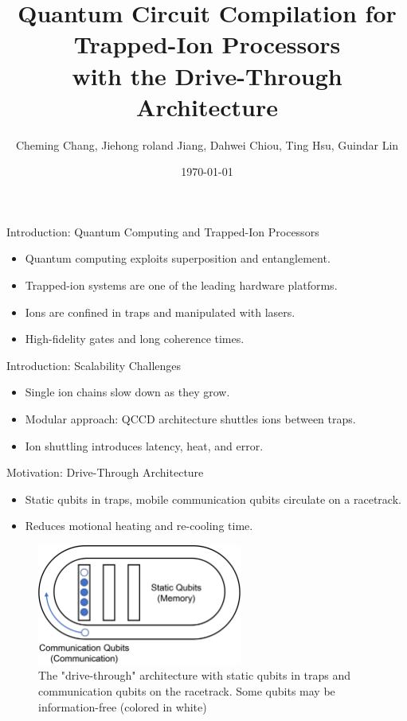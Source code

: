\documentclass{beamer}
\title{Quantum Circuit Compilation for Trapped-Ion Processors\\with the Drive-Through Architecture}
\author{Cheming Chang, Jiehong roland Jiang, Dahwei Chiou, Ting Hsu, Guindar Lin}
\institute{Taipei, Taiwan}
\date{\today}
\begin{document}
	
	\begin{frame}
		\titlepage
	\end{frame}
	
	\begin{frame}{Introduction: Quantum Computing and Trapped-Ion Processors}
		\begin{itemize}
			\item Quantum computing exploits superposition and entanglement.
			\item Trapped-ion systems are one of the leading hardware platforms.
			\item Ions are confined in traps and manipulated with lasers.
			\item High-fidelity gates and long coherence times.
		\end{itemize}
	\end{frame}
	
	\begin{frame}{Introduction: Scalability Challenges}
		\begin{itemize}
			\item Single ion chains slow down as they grow.
			\item Modular approach: QCCD architecture shuttles ions between traps.
			\item Ion shuttling introduces latency, heat, and error.
		\end{itemize}
	\end{frame}
	
	\begin{frame}{Motivation: Drive-Through Architecture}
		\begin{itemize}
			\item Static qubits in traps, mobile communication qubits circulate on a racetrack.
			\item Reduces motional heating and re-cooling time.
		\end{itemize}
		\begin{figure}
			\includegraphics[width=0.6\textwidth]{figure/arch.png}
			\caption[]{The "drive-through" architecture with static qubits in traps and communication qubits on the racetrack. Some qubits may be information-free (colored in white)}
		\end{figure}
	\end{frame}
	
\end{document}
